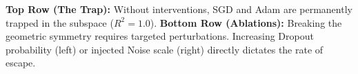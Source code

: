 \documentclass[25pt, a0paper, landscape]{tikzposter}
\newcommand{\T}{T_\theta}
\newcommand{\resultbox}[1]{%
\begin{tikzpicture}
\node[fill=accentsoft, inner sep=12pt, text width=0.92\linewidth,
      rounded corners=4pt, font=\large] (box) {#1};
\fill[accent, rounded corners=1pt]
  ([xshift=0pt]box.north west) rectangle ([xshift=2.5pt]box.south west);
\end{tikzpicture}%
}
\newcommand{\seclabel}[1]{{\small\color{tertiary}\MakeUppercase{#1}}\\[3pt]}
\newcommand{\thinrule}{\vspace{2mm}{\color{separator}\hrule height 0.4pt}\vspace{3mm}}
\begin{document}
\begin{columns}
{\vspace{2mm}
{\normalsize\color{tertiary} \textbf{Top Row (The Trap):} Without interventions, SGD and Adam are permanently trapped in the subspace ($R^2=1.0$). \textbf{Bottom Row (Ablations):} Breaking the geometric symmetry requires targeted perturbations. Increasing Dropout probability (left) or injected Noise scale (right) directly dictates the rate of escape.}
}














\end{columns}
\end{document}
